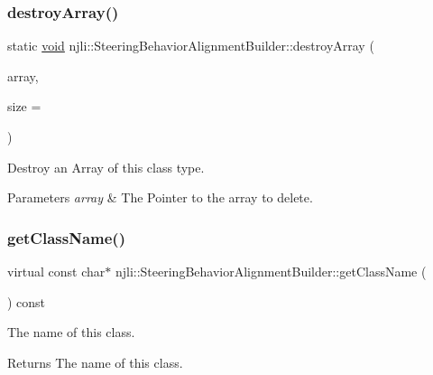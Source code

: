 \subsubsection{\texorpdfstring{destroy\+Array()}{destroyArray()}}
{\footnotesize\ttfamily static \mbox{\hyperlink{_thread_8h_af1e856da2e658414cb2456cb6f7ebc66}{void}} njli\+::\+Steering\+Behavior\+Alignment\+Builder\+::destroy\+Array (\begin{DoxyParamCaption}\item[{\mbox{\hyperlink{classnjli_1_1_steering_behavior_alignment_builder}{Steering\+Behavior\+Alignment\+Builder}} $\ast$$\ast$}]{array,  }\item[{const \mbox{\hyperlink{_util_8h_a10e94b422ef0c20dcdec20d31a1f5049}{u32}}}]{size = {} }\end{DoxyParamCaption})\hspace{0.3cm}{\ttfamily [static]}}

Destroy an Array of this class type.


\begin{DoxyParams}{Parameters}
{\em array} & The Pointer to the array to delete. \\
\hline
\end{DoxyParams}
\mbox{\label{classnjli_1_1_steering_behavior_alignment_builder_a237e899522da16f145be4e755a1b0c8c}} 
\subsubsection{\texorpdfstring{get\+Class\+Name()}{getClassName()}}
{\footnotesize\ttfamily virtual const char$\ast$ njli\+::\+Steering\+Behavior\+Alignment\+Builder\+::get\+Class\+Name (\begin{DoxyParamCaption}{ }\end{DoxyParamCaption}) const\hspace{0.3cm}{\ttfamily [virtual]}}

The name of this class.

\begin{DoxyReturn}{Returns}
The name of this class. 
\end{DoxyReturn}


